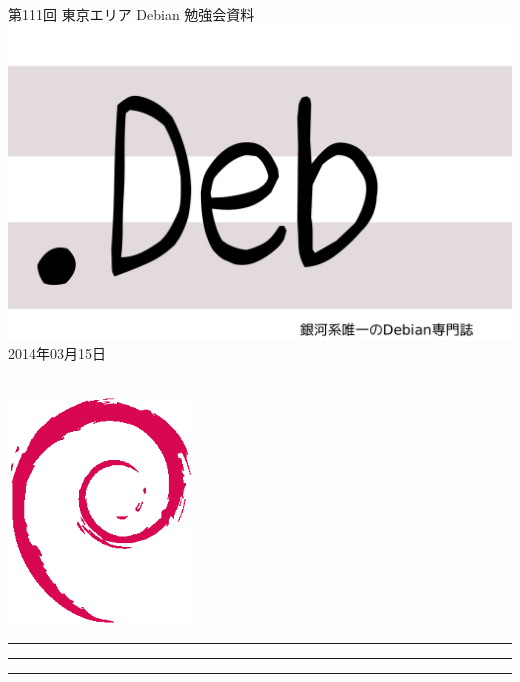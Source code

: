 \documentclass[mingoth,a4paper]{jsarticle}
\newcommand{\debmtgyear}{2014}
\newcommand{\debmtgmonth}{03}
\newcommand{\debmtgdate}{15}
\newcommand{\debmtgnumber}{111}
\begin{document}
\begin{titlepage}
\thispagestyle{empty}

\vspace*{-2cm}
第\debmtgnumber{}回 東京エリア Debian 勉強会資料\\
\hspace*{-2cm}
\includegraphics{image2012-natsu/dotdeb.pdf}\\
\hfill{}\debmtgyear{}年\debmtgmonth{}月\debmtgdate{}日

\\

\vspace*{-2cm}
\hfill{}\includegraphics[height=6cm]{image200502/openlogo-nd.eps}
\end{titlepage}

\newpage

\begin{minipage}[b]{0.2\hsize}
 \colorbox{titleback}{}
\end{minipage}
\begin{minipage}[b]{0.8\hsize}
\hrule
\vspace{2mm}
\hrule
\begin{multicols}{2}
\tableofcontents
\end{multicols}
\vspace{2mm}
\hrule
\end{minipage}
\end{document}

